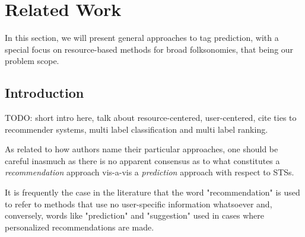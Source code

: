 \chapter{Related Work}\label{chap:related_work}

In this section, we will present general approaches to tag prediction, with a special focus on resource-based methods for broad folksonomies, that being our problem scope.

\section{Introduction}

{\color{red} TODO: short intro here, talk about resource-centered, user-centered, cite ties to recommender systems, multi label classification and multi label ranking.}

As related to how authors name their particular approaches, one should be careful inasmuch as there is no apparent consensus as to what constitutes a \textit{recommendation} approach vis-a-vis a \textit{prediction} approach with respect to STSs. 

It is frequently the case in the literature that the word "recommendation" is used to refer to methods that use no user-specific information whatsoever and, conversely, words like "prediction" and "suggestion" used in cases where personalized recommendations are made.





